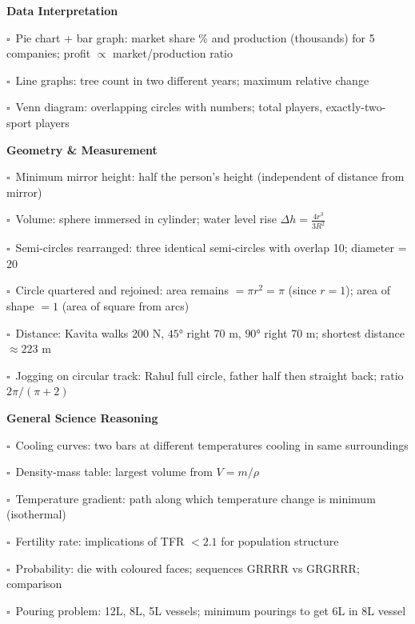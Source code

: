 \documentclass[11pt,a4paper]{article}
\newcommand{\chk}{\textcolor{rulegray}{$\square$}\ }
\begin{document}
\begin{subtopics}
  \item \textbf{Data Interpretation}
  \begin{subtopics}
    \item \chk Pie chart + bar graph: market share \% and production (thousands) for 5 companies; profit $\propto$ market/production ratio
    \item \chk Line graphs: tree count in two different years; maximum relative change
    \item \chk Venn diagram: overlapping circles with numbers; total players, exactly-two-sport players
  \end{subtopics}

  \item \textbf{Geometry \& Measurement}
  \begin{subtopics}
    \item \chk Minimum mirror height: half the person's height (independent of distance from mirror)
    \item \chk Volume: sphere immersed in cylinder; water level rise $\Delta h=\frac{4r^3}{3R^2}$
    \item \chk Semi-circles rearranged: three identical semi-circles with overlap 10; diameter = 20
    \item \chk Circle quartered and rejoined: area remains $= \pi r^2 = \pi$ (since $r=1$); area of shape $=1$ (area of square from arcs)
    \item \chk Distance: Kavita walks 200 N, $45°$ right 70 m, $90°$ right 70 m; shortest distance $\approx 223$ m
    \item \chk Jogging on circular track: Rahul full circle, father half then straight back; ratio $2\pi/(\pi+2)$
  \end{subtopics}

  \item \textbf{General Science Reasoning}
  \begin{subtopics}
    \item \chk Cooling curves: two bars at different temperatures cooling in same surroundings
    \item \chk Density-mass table: largest volume from $V=m/\rho$
    \item \chk Temperature gradient: path along which temperature change is minimum (isothermal)
    \item \chk Fertility rate: implications of TFR $< 2.1$ for population structure
    \item \chk Probability: die with coloured faces; sequences GRRRR vs GRGRRR; comparison
    \item \chk Pouring problem: 12L, 8L, 5L vessels; minimum pourings to get 6L in 8L vessel
  \end{subtopics}

\end{subtopics}
\end{document}
